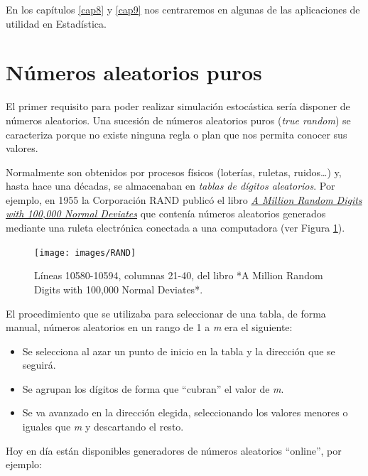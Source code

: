 \documentclass[
]{book}
\theoremstyle{break}
\theoremstyle{definition}
\theoremstyle{definition}
\theoremstyle{definition}
\theoremstyle{definition}
\theoremstyle{remark}
\begin{document}
En los capítulos \ref{cap8} y \ref{cap9} nos centraremos en algunas de las aplicaciones de utilidad en Estadística.

\hypertarget{nuxfameros-aleatorios-puros}{%
\section{Números aleatorios puros}\label{nuxfameros-aleatorios-puros}}

El primer requisito para poder realizar simulación estocástica sería disponer de números aleatorios.
Una sucesión de números aleatorios puros (\emph{true random}) se caracteriza porque no existe ninguna regla o plan que nos permita conocer sus valores.

Normalmente son obtenidos por procesos físicos (loterías, ruletas, ruidos\ldots) y, hasta hace una décadas, se almacenaban en \emph{tablas de dígitos aleatorios}.
Por ejemplo, en 1955 la Corporación RAND publicó el libro \href{https://www.rand.org/pubs/monograph_reports/MR1418.html}{\emph{A Million Random Digits with 100,000 Normal Deviates}} que contenía números aleatorios generados mediante una ruleta electrónica conectada a una computadora (ver Figura \ref{fig:randbook}).

\begin{figure}[!htb]

{\centering \texttt{[image: images/RAND]} 

}

\caption{Líneas 10580-10594, columnas 21-40, del libro *A Million Random Digits with 100,000 Normal Deviates*.}\label{fig:randbook}
\end{figure}

El procedimiento que se utilizaba para seleccionar de una tabla, de forma manual, números aleatorios
en un rango de 1 a \emph{m} era el siguiente:

\begin{itemize}
\item
  Se selecciona al azar un punto de inicio en la tabla
  y la dirección que se seguirá.
\item
  Se agrupan los dígitos de forma que ``cubran'' el valor de \emph{m}.
\item
  Se va avanzado en la dirección elegida, seleccionando los valores menores o iguales que \emph{m} y descartando el resto.
\end{itemize}

Hoy en día están disponibles generadores de números aleatorios ``online'', por ejemplo:
\end{document}
